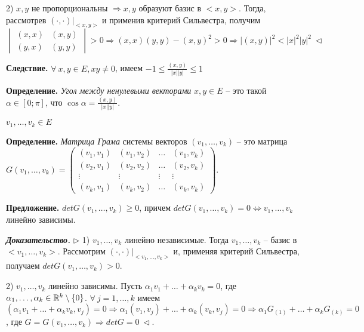 2) $x, y$ не пропорциональны $\Rightarrow x, y$ образуют базис в $<x, y>$. Тогда, рассмотрев $(\cdot, \cdot)|_{<x, y>}$ и применив критерий Сильвестра, получим $\begin{vmatrix} (x,x) & (x,y) \\ (y,x) & (y,y) \end{vmatrix} > 0 \Rightarrow (x,x)(y,y) - (x,y)^2 > 0 \Rightarrow |(x, y)|^2 < |x|^2 |y|^2 \ \lhd$

\vspace{\baselineskip}
\textbf{Следствие.} $\forall \ x, y \in E, xy \neq 0$, имеем $-1 \leq \frac{(x,y)}{|x||y|} \leq 1$ 

\vspace{\baselineskip}
\textbf{Определение.} \textit{Угол между ненулевыми векторами} $x, y \in E$ -- это такой $\alpha \in [0; \pi]$, что $\cos \alpha = \frac{(x,y)}{|x||y|}$.

\vspace{\baselineskip}
$v_1, \dots, v_k \in E$

\textbf{Определение.} \textit{Матрица Грама} системы векторов $(v_1, \dots, v_k)$ -- это матрица $G(v_1, \dots, v_k) = \begin{pmatrix} (v_1, v_1) & (v_1, v_2) & \dots & (v_1, v_k) \\
(v_2, v_1) & (v_2, v_2) & \dots & (v_2, v_k) \\
\vdots & \vdots & \vdots & \vdots \\
(v_k, v_1) & (v_k, v_2) & \dots & (v_k, v_k) \end{pmatrix}$.

\vspace{\baselineskip}
\textbf{Предложение.} $detG(v_1, \dots, v_k) \geq 0$, причем $detG(v_1, \dots, v_k) = 0 \Leftrightarrow v_1, \dots, v_k$ линейно зависимы.

\vspace{\baselineskip}
\textbf{\textit{Доказательство.}} $\rhd$ 1) $v_1, \dots, v_k$ линейно независимые. Тогда $v_1, \dots, v_k$ -- базис в $<v_1, \dots, v_k>$. Рассмотрим $(\cdot, \cdot)|_{<v_1, \dots, v_k>}$ и, применяя критерий Сильвестра, получаем $detG(v_1, \dots, v_k) > 0$.

2) $v_1, \dots, v_k$ линейно зависимы. Пусть $\alpha_1 v_1 + \dots + \alpha_k v_k = 0$, где $\alpha_1, \dots, \alpha_k \in \mathbb{R}^k \setminus \{0\}$. $\forall \ j = 1, \dots, k$ имеем $(\alpha_1 v_1 + \dots + \alpha_k v_k, v_j) = 0 \Rightarrow \alpha_1 (v_1, v_j) + \dots + \alpha_k (v_k, v_j) = 0 \Rightarrow \alpha_1 G_{(1)} + \dots + \alpha_k G_{(k)} = 0$, где $G = G(v_1, \dots, v_k) \Rightarrow detG = 0 \ \lhd$.

